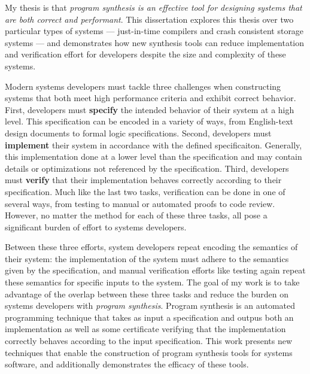 My thesis is that \textit{program
synthesis is an effective tool for designing systems that are both correct and
performant}.  This dissertation explores this thesis over two particular types
of systems --- just-in-time compilers and crash consistent storage systems ---
and demonstrates how new synthesis tools can reduce implementation and verification
effort for developers despite the size and complexity of these systems.


Modern systems developers must tackle three challenges when constructing
systems that both meet high performance criteria and exhibit correct behavior.
First, developers must \textbf{specify} the intended behavior of their system at a high
level. This specification can be encoded in a variety of ways, from
English-text design documents to formal logic specifications.
Second, developers must \textbf{implement} their system in accordance with the defined
specificaiton. Generally, this implementation done at a lower level than the
specification and may contain details or optimizations not referenced by the specification.
Third, developers must \textbf{verify} that their implementation behaves correctly 
according to their specification. Much like the last two tasks, verification can be done
in one of several ways, from testing to manual or automated proofs to code review.
However, no matter the method for each of these three tasks,
all pose a significant burden of effort to systems developers.


Between these three efforts, system developers repeat encoding the semantics of
their system: the implementation of the system must adhere to the semantics
given by the specification, and manual verification efforts like testing again
repeat these semantics for specific inputs to the system.
The goal of my work is to take advantage of the overlap between these three tasks
and reduce the burden on systems developers with \textit{program synthesis}.
Program synthesis is an automated programming technique
that takes as input a specification and outpus both an implementation
as well as some certificate verifying that the implementation correctly behaves
according to the input specification.
This work presents new techniques that enable the construction of program
synthesis tools for systems software, and additionally demonstrates the
efficacy of these tools.

